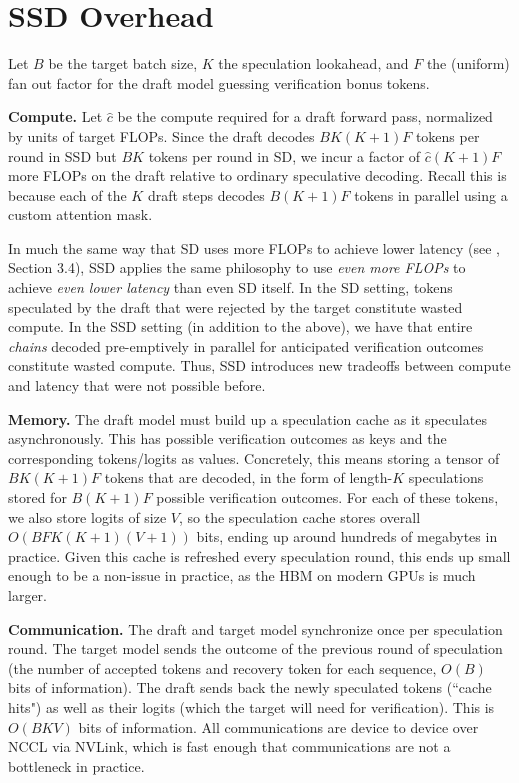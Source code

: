 \section{SSD Overhead}
\label{app:overhead}

Let $B$ be the target batch size, $K$ the speculation lookahead, and $F$ the (uniform) fan out factor for the draft model guessing verification bonus tokens. 

\textbf{Compute.} Let $\hat{c}$ be the compute required for a draft forward pass, normalized by units of target FLOPs. Since the draft decodes $BK(K+1)F$ tokens per round in SSD but $BK$ tokens per round in SD, we incur a factor of $\hat{c}(K+1)F$ more FLOPs on the draft relative to ordinary speculative decoding. Recall this is because each of the $K$ draft steps decodes $B(K+1)F$ tokens in parallel using a custom attention mask. 

In much the same way that SD uses more FLOPs to achieve lower latency (see \citep{leviathan2023}, Section 3.4), SSD applies the same philosophy to use \textit{even more FLOPs} to achieve \textit{even lower latency} than even SD itself. In the SD setting, tokens speculated by the draft that were rejected by the target constitute wasted compute. In the SSD setting (in addition to the above), we have that entire \textit{chains} decoded pre-emptively in parallel for anticipated verification outcomes constitute wasted compute. Thus, SSD introduces new tradeoffs between compute and latency that were not possible before. 

\textbf{Memory.} The draft model must build up a speculation cache as it speculates asynchronously. This has possible verification outcomes as keys and the corresponding tokens/logits as values. Concretely, this means storing a tensor of $BK(K+1)F$ tokens that are decoded, in the form of length-$K$ speculations stored for $B(K+1)F$ possible verification outcomes. For each of these tokens, we also store logits of size $V$, so the speculation cache stores overall $O\left(BFK(K+1)(V+1)\right)$ bits, ending up around hundreds of megabytes in practice. Given this cache is refreshed every speculation round, this ends up small enough to be a non-issue in practice, as the HBM on modern GPUs is much larger. 

\textbf{Communication.} The draft and target model synchronize once per speculation round. The target model sends the outcome of the previous round of speculation (the number of accepted tokens and recovery token for each sequence, $O(B)$ bits of information). The draft sends back the newly speculated tokens (``cache hits") as well as their logits (which the target will need for verification). This is $O(BKV)$ bits of information. All communications are device to device over NCCL via NVLink, which is fast enough that communications are not a bottleneck in practice. 

\color{black}